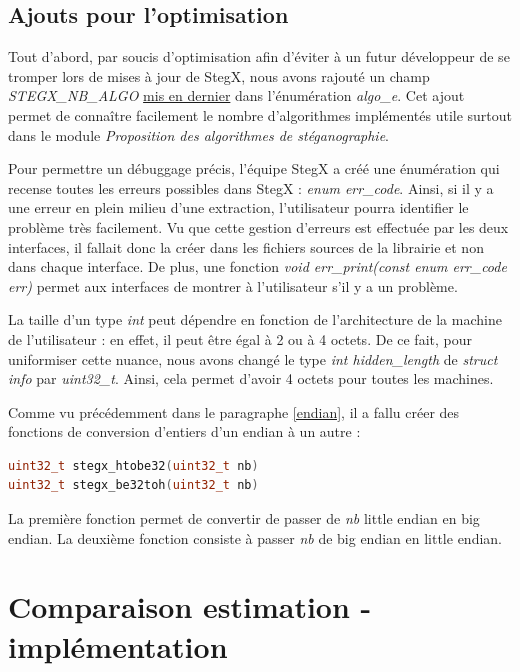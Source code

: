 \documentclass[11pt]{article}
\begin{document}
\subsection{Ajouts pour l'optimisation}

Tout d'abord, par soucis d'optimisation afin d'éviter à un futur développeur 
de se tromper lors de mises à jour de StegX, nous avons rajouté un champ 
\textit{STEGX\_NB\_ALGO} \underline{mis en dernier} dans l'énumération \textit{algo\_e}. 
Cet ajout permet de connaître facilement le nombre d'algorithmes implémentés 
utile surtout dans le module \textit{Proposition des algorithmes de stéganographie}. 
\newline

Pour permettre un débuggage précis, l'équipe StegX a créé une énumération qui
recense toutes les erreurs possibles dans StegX : \textit{enum err\_code}. 
Ainsi, si il y a une erreur en plein milieu d'une extraction, l'utilisateur 
pourra identifier le problème très facilement. Vu que cette gestion d'erreurs 
est effectuée par les deux interfaces, il fallait donc la créer dans les 
fichiers sources de la librairie et non dans chaque interface. De plus, 
une fonction \textit{void err\_print(const enum err\_code err)} permet aux 
interfaces de montrer à l'utilisateur s'il y a un problème. 
\newline

La taille d'un type \textit{int} peut dépendre en fonction de l'architecture
de la machine de l'utilisateur : en effet, il peut être égal à 2 ou à 4 octets. 
De ce fait, pour uniformiser cette nuance, nous avons changé le type 
\textit{int hidden\_length} de \textit{struct info} par \textit{uint32\_t}. 
Ainsi, cela permet d'avoir 4 octets pour toutes les machines. 
\newline 

Comme vu précédemment dans le paragraphe \ref{endian}, il a fallu créer 
des fonctions de conversion d'entiers d'un endian à un autre : 

\begin{lstlisting}[language=c]
uint32_t stegx_htobe32(uint32_t nb)
uint32_t stegx_be32toh(uint32_t nb)
\end{lstlisting}

La première fonction permet de convertir de passer de \textit{nb} little 
endian en big endian. 
La deuxième fonction consiste à passer \textit{nb} de big endian en 
little endian. 

\section{Comparaison estimation - implémentation}
\end{document}
